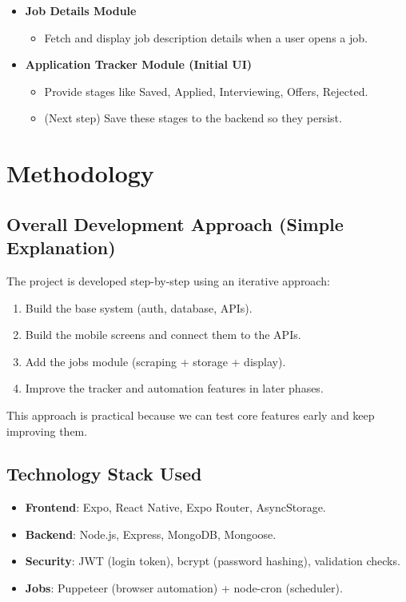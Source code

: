 \documentclass[12pt,a4paper]{report}
\begin{document}
\begin{itemize}[leftmargin=*, itemsep=6pt]
  \item \textbf{Job Details Module}
  \begin{itemize}[leftmargin=*, itemsep=4pt]
    \item Fetch and display job description details when a user opens a job.
  \end{itemize}

  \item \textbf{Application Tracker Module (Initial UI)}
  \begin{itemize}[leftmargin=*, itemsep=4pt]
    \item Provide stages like Saved, Applied, Interviewing, Offers, Rejected.
    \item (Next step) Save these stages to the backend so they persist.
  \end{itemize}
\end{itemize}

\chapter{Methodology}
\section*{Overall Development Approach (Simple Explanation)}

\noindent
The project is developed step-by-step using an iterative approach:
\begin{enumerate}[leftmargin=*, itemsep=6pt]
  \item Build the base system (auth, database, APIs).
  \item Build the mobile screens and connect them to the APIs.
  \item Add the jobs module (scraping + storage + display).
  \item Improve the tracker and automation features in later phases.
\end{enumerate}

\noindent
This approach is practical because we can test core features early and keep improving them.

\section*{Technology Stack Used}
\begin{itemize}[leftmargin=*, itemsep=6pt]
  \item \textbf{Frontend}: Expo, React Native, Expo Router, AsyncStorage.
  \item \textbf{Backend}: Node.js, Express, MongoDB, Mongoose.
  \item \textbf{Security}: JWT (login token), bcrypt (password hashing), validation checks.
  \item \textbf{Jobs}: Puppeteer (browser automation) + node-cron (scheduler).
\end{itemize}
\end{document}
